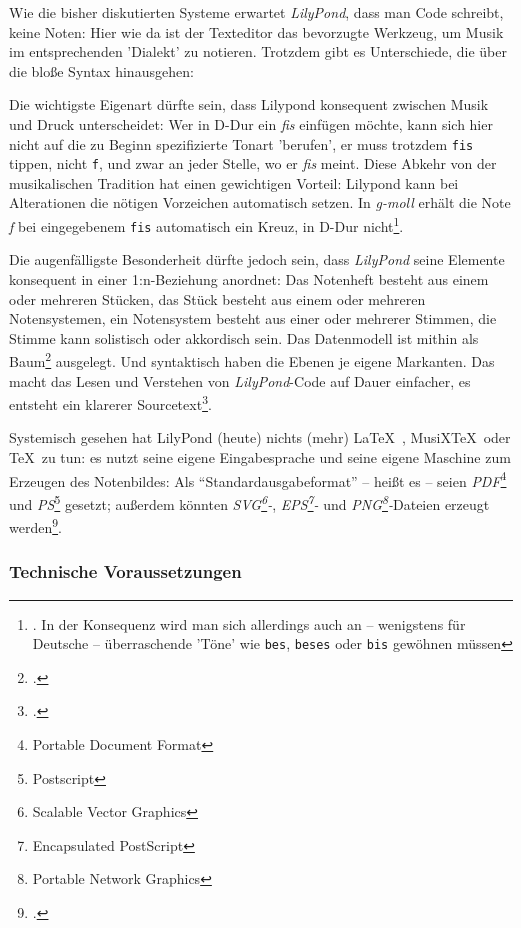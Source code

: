 Wie die bisher diskutierten Systeme erwartet \textit{LilyPond}, dass man Code
schreibt, keine Noten: Hier wie da ist der Texteditor das bevorzugte Werkzeug,
um Musik im entsprechenden 'Dialekt' zu notieren. Trotzdem gibt es Unterschiede,
die über die bloße Syntax hinausgehen:

Die wichtigste Eigenart dürfte sein, dass Lilypond konsequent zwischen Musik und
Druck unterscheidet: Wer in D-Dur ein \textit{fis} einfügen möchte, kann sich
hier nicht auf die zu Beginn spezifizierte Tonart 'berufen', er muss trotzdem
\texttt{fis} tippen, nicht \texttt{f}, und zwar an jeder Stelle, wo er
\textit{fis} meint. Diese Abkehr von der musikalischen Tradition hat einen
gewichtigen Vorteil: Lilypond kann bei Alterationen die nötigen Vorzeichen
automatisch setzen. In \textit{g-moll} erhält die Note \textit{f} bei
eingegebenem \texttt{fis} automatisch ein Kreuz, in D-Dur
nicht\footnote{\cite[vgl.][21]{LilyPond2018b}. In der Konsequenz wird man sich
allerdings auch an -- wenigstens für Deutsche -- überraschende 'Töne' wie
\texttt{bes}, \texttt{beses} oder \texttt{bis} gewöhnen müssen}.

Die augenfälligste Besonderheit dürfte jedoch sein, dass \textit{LilyPond} seine
Elemente konsequent in einer 1:n-Beziehung anordnet: Das Notenheft besteht aus
einem oder mehreren Stücken, das Stück besteht aus einem oder mehreren
Notensystemen, ein Notensystem besteht aus einer oder mehrerer Stimmen, die
Stimme kann solistisch oder akkordisch sein. Das Datenmodell ist mithin als
Baum\footcite[vgl.][\nopage wp.]{WpedBaum2019a} ausgelegt. Und syntaktisch haben
die Ebenen je eigene Markanten. Das macht das Lesen und Verstehen von
\textit{LilyPond}-Code auf Dauer einfacher, es entsteht ein klarerer
Sourcetext\footcite[vgl.][40ff]{LilyPond2018b}.

Systemisch gesehen hat LilyPond (heute) nichts (mehr) \LaTeX\ , MusiX\TeX\ oder
\TeX\ zu tun: es nutzt seine eigene Eingabesprache und seine eigene Maschine zum
Erzeugen des Notenbildes: Als \enquote{Standardausgabeformat} -- heißt es --
seien \textit{PDF}\footnote{Portable Document Format} und
\textit{PS}\footnote{Postscript} gesetzt; außerdem könnten
\textit{SVG\footnote{Scalable Vector Graphics}-}, \textit{EPS\footnote{Encapsulated
PostScript}-} und \textit{PNG\footnote{Portable Network Graphics}-}Dateien erzeugt
werden\footcite[vgl.][481]{LilyPond2018c}.

\subsubsection{Technische Voraussetzungen}

